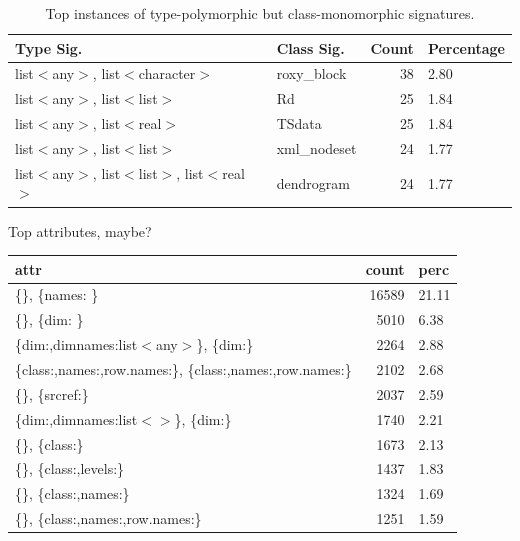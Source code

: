 \documentclass[acmsmall,10pt,review,anonymous]{acmart}\settopmatter{printfolios=true,printccs=false,printacmref=false}
\begin{document}
\begin{table}[ht]
\centering
\begin{tabular}{llrl}
  \hline
  Type Sig. & Class Sig. & Count & Percentage \\ 
  \hline
  list$<$any$>$, list$<$character$>$ & roxy\_block & 38 & 2.80 \\ 
  list$<$any$>$, list$<$list$>$ & Rd & 25 & 1.84 \\ 
  list$<$any$>$, list$<$real$>$ & TSdata & 25 & 1.84 \\ 
  list$<$any$>$, list$<$list$>$ & xml\_nodeset & 24 & 1.77 \\ 
  list$<$any$>$, list$<$list$>$, list$<$real$>$ & dendrogram & 24 & 1.77 \\ 
   \hline
\end{tabular}
\caption{Top instances of type-polymorphic but class-monomorphic signatures.}
\end{table}


Top attributes, maybe?

\begin{table}[ht]
\centering
\begin{tabular}{lrl}
  \hline
attr & count & perc \\ 
  \hline
\{\}, \{names: \C\} & 16589 & 21.11 \\ 
  \{\}, \{dim: \I\} & 5010 & 6.38 \\ 
  \{dim:\I,dimnames:list$<$any$>$\}, \{dim:\I\} & 2264 & 2.88 \\ 
  \{class:\C,names:\C,row.names:\C\}, \{class:\C,names:\C,row.names:\I\} & 2102 & 2.68 \\ 
  \{\}, \{srcref:\I\} & 2037 & 2.59 \\ 
  \{dim:\I,dimnames:list$<$\C$>$\}, \{dim:\I\} & 1740 & 2.21 \\ 
  \{\}, \{class:\C\} & 1673 & 2.13 \\ 
  \{\}, \{class:\C,levels:\C\} & 1437 & 1.83 \\ 
  \{\}, \{class:\C,names:\C\} & 1324 & 1.69 \\ 
  \{\}, \{class:\C,names:\C,row.names:\I\} & 1251 & 1.59 \\ 
   \hline
\end{tabular}
\end{table}
\end{document}

